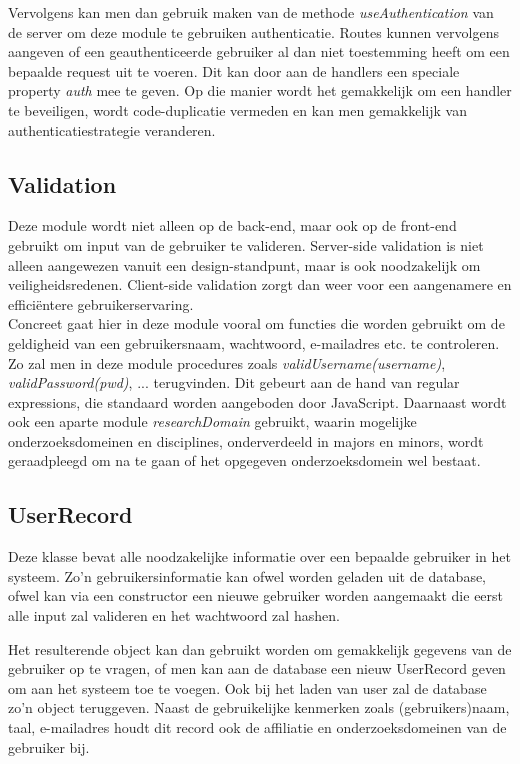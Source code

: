 \documentclass{article}
\begin{document}
Vervolgens kan men dan gebruik maken van de methode \textit{useAuthentication} van de server om deze module te gebruiken authenticatie. Routes kunnen vervolgens aangeven of een geauthenticeerde gebruiker al dan niet toestemming heeft om een bepaalde request uit te voeren. Dit kan door aan de handlers een speciale property \textit{auth} mee te geven. Op die manier wordt het gemakkelijk om een handler te beveiligen, wordt code-duplicatie vermeden en kan men gemakkelijk van authenticatiestrategie veranderen.

\subsection{Validation}

Deze module wordt niet alleen op de back-end, maar ook op de front-end gebruikt om input van de gebruiker te valideren. Server-side validation is niet alleen aangewezen vanuit een design-standpunt, maar is ook noodzakelijk om veiligheidsredenen. Client-side validation zorgt dan weer voor een aangenamere en effici\"entere gebruikerservaring. \\

Concreet gaat hier in deze module vooral om functies die worden gebruikt om de geldigheid van een gebruikersnaam, wachtwoord, e-mailadres etc. te controleren. Zo zal men in deze module procedures zoals \textit{validUsername(username)}, \textit{validPassword(pwd)}, ... terugvinden. Dit gebeurt aan de hand van regular expressions, die standaard worden aangeboden door JavaScript. Daarnaast wordt ook een aparte module \textit{researchDomain} gebruikt, waarin mogelijke onderzoeksdomeinen en disciplines, onderverdeeld in majors en minors, wordt geraadpleegd om na te gaan of het opgegeven onderzoeksdomein wel bestaat.

\subsection{UserRecord}

Deze klasse bevat alle noodzakelijke informatie over een bepaalde gebruiker in het systeem. Zo'n gebruikersinformatie kan ofwel worden geladen uit de database, ofwel kan via een constructor een nieuwe gebruiker worden aangemaakt die eerst alle input zal valideren en het wachtwoord zal hashen.

Het resulterende object kan dan gebruikt worden om gemakkelijk gegevens van de gebruiker op te vragen, of men kan aan de database een nieuw UserRecord geven om aan het systeem toe te voegen. Ook bij het laden van user zal de database zo'n object teruggeven. Naast de gebruikelijke kenmerken zoals (gebruikers)naam, taal, e-mailadres houdt dit record ook de affiliatie en onderzoeksdomeinen van de gebruiker bij.
\end{document}
